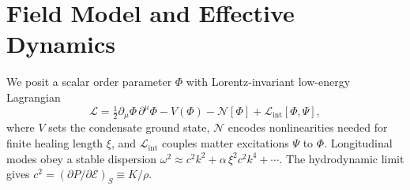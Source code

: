 
\section{Field Model and Effective Dynamics}\label{sec:model}
We posit a scalar order parameter $\Phi$ with Lorentz-invariant low-energy Lagrangian
\begin{equation}
\mathcal{L} = \tfrac{1}{2}\partial_\mu\Phi\,\partial^\mu\Phi - V(\Phi) - \mathcal{N}[\Phi] + \mathcal{L}_\text{int}[\Phi,\Psi],
\end{equation}
where $V$ sets the condensate ground state, $\mathcal{N}$ encodes nonlinearities needed for finite healing length $\xi$, and $\mathcal{L}_\text{int}$ couples matter excitations $\Psi$ to $\Phi$. Longitudinal modes obey a stable dispersion $\omega^2 \approx c^2 k^2 + \alpha\,\xi^2 c^2 k^4 + \cdots$. The hydrodynamic limit gives $c^2 = (\partial P/\partial\mathcal{E})_S \equiv K/\rho$.
